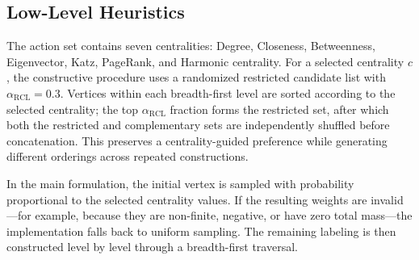 \documentclass[runningheads]{llncs}
\begin{document}

\subsection{Low-Level Heuristics}

The action set contains seven centralities: Degree, Closeness, Betweenness, Eigenvector, Katz, PageRank, and Harmonic centrality. For a selected centrality $c$, the constructive procedure uses a randomized restricted candidate list with $\alpha_{\mathrm{RCL}}=0.3$. Vertices within each breadth-first level are sorted according to the selected centrality; the top $\alpha_{\mathrm{RCL}}$ fraction forms the restricted set, after which both the restricted and complementary sets are independently shuffled before concatenation. This preserves a centrality-guided preference while generating different orderings across repeated constructions.

In the main formulation, the initial vertex is sampled with probability proportional to the selected centrality values. If the resulting weights are invalid---for example, because they are non-finite, negative, or have zero total mass---the implementation falls back to uniform sampling. The remaining labeling is then constructed level by level through a breadth-first traversal.
\end{document}
